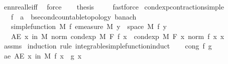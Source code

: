 \begin{isabellebody}
\ ennreal{\isacharunderscore}{\kern0pt}le{\isacharunderscore}{\kern0pt}iff{}\ \isamarkupfalse%
\ force\isanewline
\ \ \isamarkupfalse%
\ {\isacharquery}{\kern0pt}thesis\ \isamarkupfalse%
\ {\isacharasterisk}{\kern0pt}\ \isamarkupfalse%
\ fastforce\isanewline
{}\isamarkupfalse%
%
\endisatagproof
{\isafoldproof}%
%
\isadelimproof
\isanewline
%
\endisadelimproof
\isanewline
{}\isamarkupfalse%
\ cond{\isacharunderscore}{\kern0pt}exp{\isacharunderscore}{\kern0pt}contraction{\isacharunderscore}{\kern0pt}simple{\isacharcolon}{\kern0pt}\isanewline
\ \ \ f\ {\isacharcolon}{\kern0pt}{\isacharcolon}{\kern0pt}\ {\isachardoublequoteopen}{\isacharprime}{\kern0pt}a\ {\isasymRightarrow}\ {\isacharprime}{\kern0pt}b{\isacharcolon}{\kern0pt}{\isacharcolon}{\kern0pt}{\isacharbraceleft}{\kern0pt}second{\isacharunderscore}{\kern0pt}countable{\isacharunderscore}{\kern0pt}topology{\isacharcomma}{\kern0pt}\ banach{\isacharbraceright}{\kern0pt}{\isachardoublequoteclose}\isanewline
\ \ \ {\isachardoublequoteopen}simple{\isacharunderscore}{\kern0pt}function\ M\ f{\isachardoublequoteclose}\ {\isachardoublequoteopen}emeasure\ M\ {\isacharbraceleft}{\kern0pt}y\ {\isasymin}\ space\ M{\isachardot}{\kern0pt}\ f\ y\ {\isasymnoteq}\ {}{\isacharbraceright}{\kern0pt}\ {\isasymnoteq}\ {\isasyminfinity}{\isachardoublequoteclose}\isanewline
\ \ \ {\isachardoublequoteopen}AE\ x\ in\ M{\isachardot}{\kern0pt}\ norm\ {\isacharparenleft}{\kern0pt}cond{\isacharunderscore}{\kern0pt}exp\ M\ F\ f\ x{\isacharparenright}{\kern0pt}\ {\isasymle}\ cond{\isacharunderscore}{\kern0pt}exp\ M\ F\ {\isacharparenleft}{\kern0pt}{\isasymlambda}x{\isachardot}{\kern0pt}\ norm\ {\isacharparenleft}{\kern0pt}f\ x{\isacharparenright}{\kern0pt}{\isacharparenright}{\kern0pt}\ x{\isachardoublequoteclose}\isanewline
%
\isadelimproof
\ \ %
\endisadelimproof
%
\isatagproof
{}\isamarkupfalse%
\ assms\isanewline
{}\isamarkupfalse%
\ {\isacharparenleft}{\kern0pt}induction\ rule{\isacharcolon}{\kern0pt}\ integrable{\isacharunderscore}{\kern0pt}simple{\isacharunderscore}{\kern0pt}function{\isacharunderscore}{\kern0pt}induct{\isacharparenright}{\kern0pt}\isanewline
\ \ \isamarkupfalse%
\ {\isacharparenleft}{\kern0pt}cong\ f\ g{\isacharparenright}{\kern0pt}\isanewline
\ \ \isamarkupfalse%
\ ae{\isacharcolon}{\kern0pt}\ {\isachardoublequoteopen}AE\ x\ in\ M{\isachardot}{\kern0pt}\ f\ x\ {\isacharequal}{\kern0pt}\ g\ x{\isachardoublequoteclose}\ \isamarkupfalse%

\end{isabellebody}
